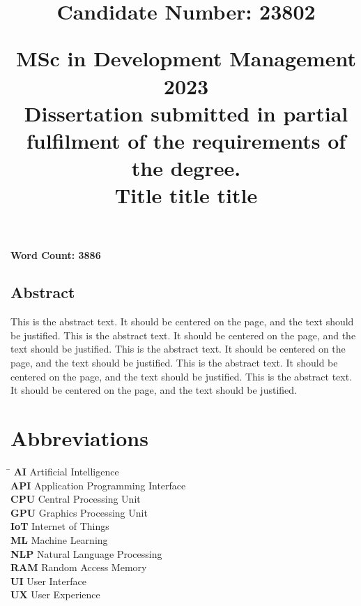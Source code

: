 \documentclass[12pt]{article}%
\title{
        \begin{flushright}
        \large \textbf{Candidate Number: 23802}
        \end{flushright}
        \vspace*{30mm}
        \begin{center}
        \large MSc in Development Management 2023 \\
        \vspace*{5mm}
        Dissertation submitted in partial fulfilment of the requirements of the degree. \\
        \vspace*{35mm}
        \Huge \textbf{Title title title} \\
        \vspace*{20mm}
        \end{center}
    }%
\date{}%
\begin{document}
%
\normalsize%
%
\pagestyle{frontmatter}%
\maketitle%

\vfill
\begin{center}\textbf{Word Count: 3886}\end{center}
\newpage%
\vspace*{\fill}%
\begin{center}%
\begin{minipage}{0.8\textwidth}%
\begin{center}%
\section*{Abstract}%
\end{center}%
\justify%
This is the abstract text. It should be centered on the page, and the text should be justified. This is the abstract text. It should be centered on the page, and the text should be justified. This is the abstract text. It should be centered on the page, and the text should be justified. This is the abstract text. It should be centered on the page, and the text should be justified. This is the abstract text. It should be centered on the page, and the text should be justified. %
\end{minipage}%
\end{center}%
\vspace*{\fill}%
\newpage%
\tableofcontents%
\newpage%
\section*{Abbreviations}%
\label{sec:Abbreviations}%
\begin{tabbing}%
\hspace{3cm} \= \kill%
\textbf{AI} \> Artificial Intelligence \\%
\textbf{API} \> Application Programming Interface \\%
\textbf{CPU} \> Central Processing Unit \\%
\textbf{GPU} \> Graphics Processing Unit \\%
\textbf{IoT} \> Internet of Things \\%
\textbf{ML} \> Machine Learning \\%
\textbf{NLP} \> Natural Language Processing \\%
\textbf{RAM} \> Random Access Memory \\%
\textbf{UI} \> User Interface \\%
\textbf{UX} \> User Experience \\%
\end{tabbing}
\end{document}
